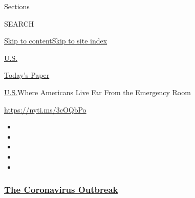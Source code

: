 Sections

SEARCH

\protect\hyperlink{site-content}{Skip to
content}\protect\hyperlink{site-index}{Skip to site index}

\href{https://www.nytimes3xbfgragh.onion/section/us}{U.S.}

\href{https://myaccount.nytimes3xbfgragh.onion/auth/login?response_type=cookie\&client_id=vi}{}

\href{https://www.nytimes3xbfgragh.onion/section/todayspaper}{Today's
Paper}

\href{/section/us}{U.S.}\textbar{}Where Americans Live Far From the
Emergency Room

\url{https://nyti.ms/3cOQbPo}

\begin{itemize}
\item
\item
\item
\item
\item
\end{itemize}

\hypertarget{the-coronavirus-outbreak}{%
\subsubsection{\texorpdfstring{\href{https://www.nytimes3xbfgragh.onion/news-event/coronavirus?name=styln-coronavirus-national\&region=TOP_BANNER\&variant=undefined\&block=storyline_menu_recirc\&action=click\&pgtype=Interactive\&impression_id=2805e3f0-e38d-11ea-befc-036b724b9a9b}{The
Coronavirus
Outbreak}}{The Coronavirus Outbreak}}\label{the-coronavirus-outbreak}}

